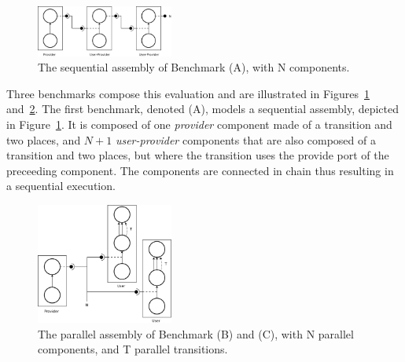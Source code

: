 
\begin{figure}[h]
  \begin{center}
    \includegraphics[width=0.4\textwidth]{./images/seq.pdf}
    \caption{The \mad sequential assembly of Benchmark (A), with N components.}
    \label{fig:seq}
  \end{center}
\end{figure}

Three benchmarks compose this evaluation and are illustrated in
Figures~\ref{fig:seq} and~\ref{fig:par}.
The first benchmark, denoted (A), models a sequential \mad assembly,
depicted in Figure~\ref{fig:seq}. It is composed of one
\emph{provider} component made of a transition and two places, and
$N+1$ \emph{user-provider} components that are also composed of a
transition and two places, but where the transition uses the provide
port of the preceeding component. The components are connected in
chain thus resulting in a sequential execution.

\begin{figure}[h]
  \begin{center}
    \includegraphics[width=0.4\textwidth]{./images/par.pdf}
    \caption{The \mad parallel assembly of Benchmark (B) and (C), with N parallel components, and T parallel transitions.}
    \label{fig:par}
  \end{center}
\end{figure}

